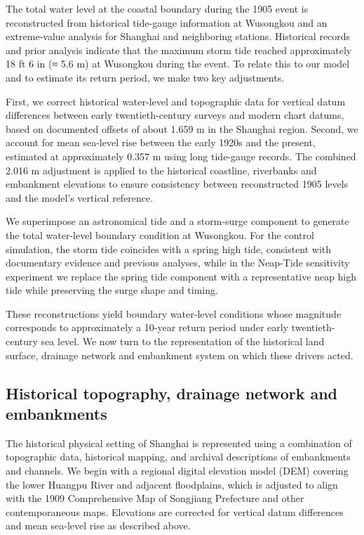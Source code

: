 \documentclass[
]{article}
\begin{document}
The total water level at the coastal boundary during the 1905 event is
reconstructed from historical tide-gauge information at Wusongkou and an
extreme-value analysis for Shanghai and neighboring stations. Historical
records and prior analysis indicate that the maximum storm tide reached
approximately 18 ft 6 in (≈ 5.6 m) at Wusongkou during the event. To
relate this to our model and to estimate its return period, we make two
key adjustments.

First, we correct historical water-level and topographic data for
vertical datum differences between early twentieth-century surveys and
modern chart datums, based on documented offsets of about 1.659 m in the
Shanghai region. Second, we account for mean sea-level rise between the
early 1920s and the present, estimated at approximately 0.357 m using
long tide-gauge records. The combined 2.016 m adjustment is applied to
the historical coastline, riverbanks and embankment elevations to ensure
consistency between reconstructed 1905 levels and the model's vertical
reference.

We superimpose an astronomical tide and a storm-surge component to
generate the total water-level boundary condition at Wusongkou. For the
control simulation, the storm tide coincides with a spring high tide,
consistent with documentary evidence and previous analyses, while in the
Neap-Tide sensitivity experiment we replace the spring tide component
with a representative neap high tide while preserving the surge shape
and timing.

These reconstructions yield boundary water-level conditions whose
magnitude corresponds to approximately a 10-year return period under
early twentieth-century sea level. We now turn to the representation of
the historical land surface, drainage network and embankment system on
which these drivers acted.

\subsection{\texorpdfstring{\textbf{Historical topography, drainage
network and
embankments}}{Historical topography, drainage network and embankments}}\label{historical-topography-drainage-network-and-embankments}

The historical physical setting of Shanghai is represented using a
combination of topographic data, historical mapping, and archival
descriptions of embankments and channels. We begin with a regional
digital elevation model (DEM) covering the lower Huangpu River and
adjacent floodplains, which is adjusted to align with the 1909
Comprehensive Map of Songjiang Prefecture and other contemporaneous
maps. Elevations are corrected for vertical datum differences and mean
sea-level rise as described above.
\end{document}
